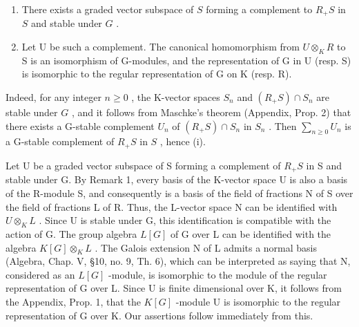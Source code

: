 \begin{enumerate}
\def\labelenumi{(\roman{enumi})}
\item
  There exists a graded vector subspace of \(S\) forming a complement to \(R_{+}S\) in \(S\) and stable under \(G\) .
\item
  Let U be such a complement. The canonical homomorphism from \(U \otimes_{K} R\) to S is an isomorphism of G-modules, and the representation of G in U (resp. S) is isomorphic to the regular representation of G on K (resp. R).
\end{enumerate}

Indeed, for any integer \(n \geqslant 0\) , the K-vector spaces \(S_n\) and \((R_+S) \cap S_n\) are stable under \(G\) , and it follows from Maschke's theorem (Appendix, Prop. 2) that there exists a G-stable complement \(U_n\) of \((R_+S) \cap S_n\) in \(S_n\) . Then \(\sum_{n \geqslant 0} U_n\) is a G-stable complement of \(R_+S\) in \(S\) , hence (i).

Let U be a graded vector subspace of S forming a complement of \(R_{+}S\) in S and stable under G. By Remark 1, every basis of the K-vector space U is also a basis of the R-module S, and consequently is a basis of the field of fractions N of S over the field of fractions L of R. Thus, the L-vector space N can be identified with \(U \otimes_{K} L\) . Since U is stable under G, this identification is compatible with the action of G. The group algebra \(L[G]\) of G over L can be identified with the algebra \(K[G] \otimes_{K} L\) . The Galois extension N of L admits a normal basis (Algebra, Chap. V, §10, no. 9, Th. 6), which can be interpreted as saying that N, considered as an \(L[G]\) -module, is isomorphic to the module of the regular representation of G over L. Since U is finite dimensional over K, it follows from the Appendix, Prop. 1, that the \(K[G]\) -module U is isomorphic to the regular representation of G over K. Our assertions follow immediately from this.


